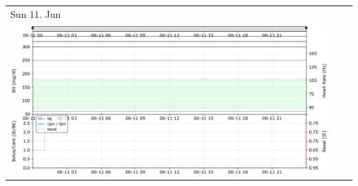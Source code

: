 \newpage

\begin{tabularx}{\linewidth}{YYY}
Sun 11. Jun\\
\includegraphics[scale=0.53,keepaspectratio,trim={0 0 0 0},clip]{plot_daily_170611.png}
\end{tabularx}

